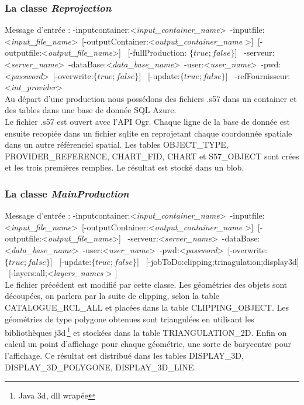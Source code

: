 \subsubsection{La classe \textit{Reprojection}}
Message d'entrée : 
-inputcontainer:\textless \textit{input\_container\_name}\textgreater \   
-inputfile:\textless \textit{input\_file\_name}\textgreater \ 
[-outputContainer:\textless \textit{output\_container\_name} \textgreater ]\  
[-outputfile:\textless \textit{output\_file\_name}\textgreater ] \ 
[-fullProduction: $\{true;false\}$] \ 
-serveur:\textless \textit{server\_name}\textgreater \   
-dataBase:\textless \textit{data\_base\_name}\textgreater \   
-user:\textless \textit{user\_name}\textgreater  \ 
-pwd:\textless \textit{password}\textgreater  \ 
[-overwrite:$\{true;false\}$] \ 
[-update:$\{true;false\}$] \ 
-refFournisseur:\textless \textit{int\_provider}\textgreater \\   

Au départ d'une production nous possédons des fichiers .s57 dans un
container et des tables dans une base de donnée SQL Azure.  \\

Le fichier .s57 est ouvert avec l'API Ogr. Chaque ligne de la base de
donnée est ensuite recopiée dans un fichier sqlite en reprojetant
chaque coordonnée spatiale dans un autre référenciel spatial. Les
tables OBJECT\_TYPE, PROVIDER\_REFERENCE, CHART\_FID, CHART et
S57\_OBJECT sont crées et les trois premières remplies. Le résultat
est stocké dans un blob.


\subsubsection{La classe \textit{MainProduction}}
Message d'entrée : 
-inputcontainer:\textless \textit{input\_container\_name}\textgreater \   
-inputfile:\textless \textit{input\_file\_name}\textgreater \ 
[-outputContainer:\textless \textit{output\_container\_name} \textgreater ]\  
[-outputfile:\textless \textit{output\_file\_name}\textgreater ] \ 
-serveur:\textless \textit{server\_name}\textgreater \   
-dataBase:\textless \textit{data\_base\_name}\textgreater \   
-user:\textless \textit{user\_name}\textgreater  \ 
-pwd:\textless \textit{password}\textgreater  \ 
[-overwrite:$\{true;false\}$] \ 
[-update:$\{true;false\}$] \ 
[-jobToDo:{clipping;trinagulation;display3d}] \ 
[-layers:{all;\textless \textit{layers\_names} \textgreater} ] \\ 

Le fichier précédent est modifié par cette classe. Les géométries des
objets sont découpées, on parlera par la suite de clipping, selon la
table CATALOGUE\_RCL\_ALL et placées dans la table
CLIPPING\_OBJECT. Les géométries de type polygone obtenues sont
triangulées en utilisant les bibliothèques j3d\,\footnote{Java 3d, dll
  wrapée} et stockées dans la table TRIANGULATION\_2D. Enfin on calcul
un point d'affichage pour chaque géométrie, une sorte de barycentre
pour l'affichage. Ce résultat est distribué dans les tables
DISPLAY\_3D, DISPLAY\_3D\_POLYGONE, DISPLAY\_3D\_LINE.




